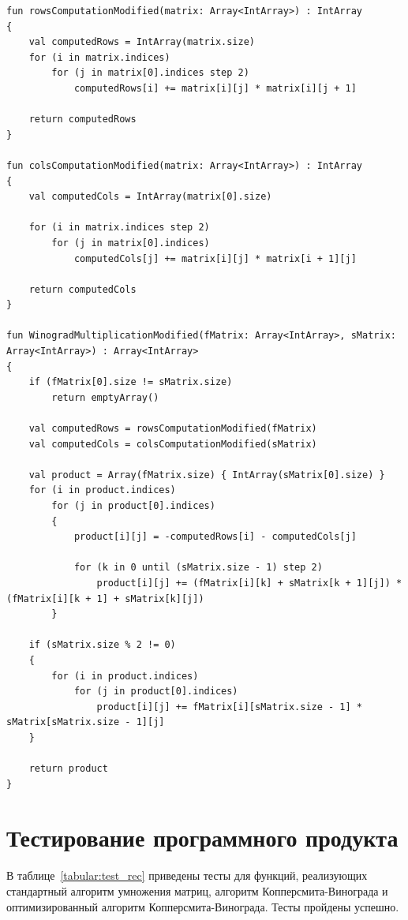 \documentclass[12pt]{report}
\begin{document}
\begin{lstlisting}[caption=Функция реализации улучшенного алгоритма Копперсмита-Винограда,
label={WindogradUpd}]
fun rowsComputationModified(matrix: Array<IntArray>) : IntArray
{
    val computedRows = IntArray(matrix.size)
    for (i in matrix.indices)
        for (j in matrix[0].indices step 2)
            computedRows[i] += matrix[i][j] * matrix[i][j + 1]

    return computedRows
}

fun colsComputationModified(matrix: Array<IntArray>) : IntArray
{
    val computedCols = IntArray(matrix[0].size)

    for (i in matrix.indices step 2)
        for (j in matrix[0].indices)
            computedCols[j] += matrix[i][j] * matrix[i + 1][j]

    return computedCols
}

fun WinogradMultiplicationModified(fMatrix: Array<IntArray>, sMatrix: Array<IntArray>) : Array<IntArray>
{
    if (fMatrix[0].size != sMatrix.size)
        return emptyArray()

    val computedRows = rowsComputationModified(fMatrix)
    val computedCols = colsComputationModified(sMatrix)

    val product = Array(fMatrix.size) { IntArray(sMatrix[0].size) }
    for (i in product.indices)
        for (j in product[0].indices)
        {
            product[i][j] = -computedRows[i] - computedCols[j]

            for (k in 0 until (sMatrix.size - 1) step 2)
                product[i][j] += (fMatrix[i][k] + sMatrix[k + 1][j]) * (fMatrix[i][k + 1] + sMatrix[k][j])
        }

    if (sMatrix.size % 2 != 0)
    {
        for (i in product.indices)
            for (j in product[0].indices)
                product[i][j] += fMatrix[i][sMatrix.size - 1] * sMatrix[sMatrix.size - 1][j]
    }

    return product
}
\end{lstlisting}

\section{Тестирование программного продукта}
В таблице~\ref{tabular:test_rec} приведены тесты для функций, реализующих стандартный алгоритм умножения матриц, алгоритм Копперсмита-Винограда и оптимизированный алгоритм Копперсмита-Винограда. Тесты пройдены успешно.
\end{document}
